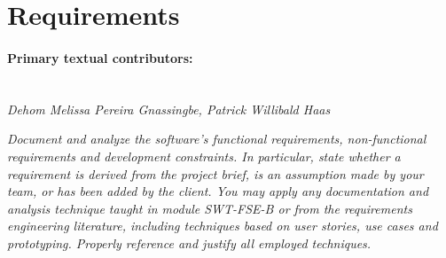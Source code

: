 \section{Requirements}
\label{sec:requirements}

\paragraph{Primary textual contributors:}
\mbox{}\\\emph{Dehom Melissa Pereira Gnassingbe, Patrick Willibald Haas}

\emph{Document and analyze the software's functional requirements, 
non-functional requirements and development constraints. In particular, state 
whether a requirement is derived from the project brief, is an assumption made 
by your team, or has been added by the client. You may apply any documentation 
and analysis technique taught in module SWT-FSE-B or from the requirements 
engineering literature, including techniques based on user stories, use cases 
and prototyping. Properly reference and justify all employed techniques.}


